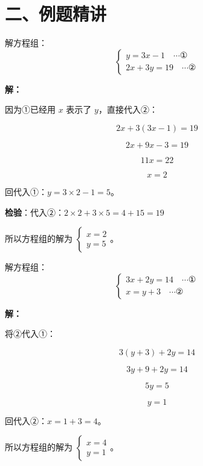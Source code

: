 \documentclass[12pt, a4paper]{ctexart}
\begin{document}
\section*{\textcolor{examorange}{二、例题精讲}}

\begin{examplebox}[【例题1】用代入消元法解方程组]
解方程组：
$$\begin{cases} y = 3x - 1 \quad \cdots ① \\ 2x + 3y = 19 \quad \cdots ② \end{cases}$$
\end{examplebox}

\textbf{解：}

因为①已经用 $x$ 表示了 $y$，直接代入②：

$$2x + 3(3x - 1) = 19$$

$$2x + 9x - 3 = 19$$

$$11x = 22$$

$$x = 2$$

回代入①：$y = 3 \times 2 - 1 = 5$。

\textbf{检验}：代入②：$2 \times 2 + 3 \times 5 = 4 + 15 = 19$ \quad \checkmark

所以方程组的解为 $\boxed{\begin{cases} x = 2 \\ y = 5 \end{cases}}$。

\bigskip

\begin{examplebox}
解方程组：
$$\begin{cases} 3x + 2y = 14 \quad \cdots ① \\ x = y + 3 \quad \cdots ② \end{cases}$$
\end{examplebox}

\textbf{解：}

将②代入①：

$$3(y + 3) + 2y = 14$$

$$3y + 9 + 2y = 14$$

$$5y = 5$$

$$y = 1$$

回代入②：$x = 1 + 3 = 4$。

所以方程组的解为 $\boxed{\begin{cases} x = 4 \\ y = 1 \end{cases}}$。
\end{document}
